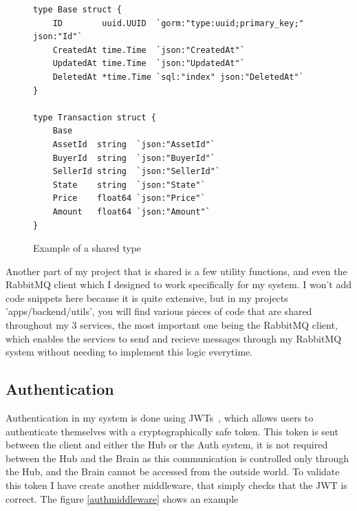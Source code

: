 \documentclass[titlepage]{article}
\begin{document}
\begin{figure}
  \begin{verbatim}
type Base struct {
	ID        uuid.UUID  `gorm:"type:uuid;primary_key;" json:"Id"`
	CreatedAt time.Time  `json:"CreatedAt"`
	UpdatedAt time.Time  `json:"UpdatedAt"`
	DeletedAt *time.Time `sql:"index" json:"DeletedAt"`
}

type Transaction struct {
	Base
	AssetId  string  `json:"AssetId"`
	BuyerId  string  `json:"BuyerId"`
	SellerId string  `json:"SellerId"`
	State    string  `json:"State"`
	Price    float64 `json:"Price"`
	Amount   float64 `json:"Amount"`
}
  \end{verbatim}
  \caption{Example of a shared type}
  \label{sharedtype}
\end{figure}

Another part of my project that is shared is a few utility functions, and even the RabbitMQ client which I designed to work specifically for my system. I won't add code snippets here because it is quite extensive, but in my projects 'apps/backend/utils', you will find various pieces of code that are shared throughout my 3 services, the most important one being the RabbitMQ client, which enables the services to send and recieve messages through my RabbitMQ system without needing to implement this logic everytime.

\pagebreak

\subsection{Authentication}
Authentication in my system is done using JWTs~\cite{jwt}, which allows users to authenticate themselves with a cryptographically safe token. This token is sent between the client and either the Hub or the Auth system, it is not required between the Hub and the Brain as this communication is controlled only through the Hub, and the Brain cannot be accessed from the outside world. To validate this token I have create another middleware, that simply checks that the JWT is correct. The figure \ref{authmiddleware} shows an example
\end{document}

